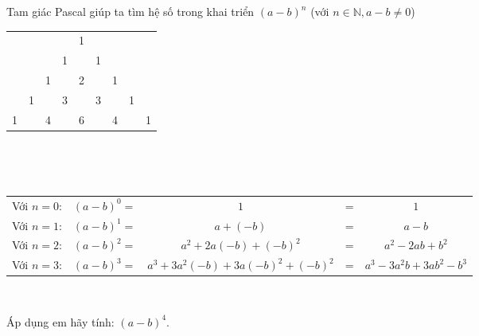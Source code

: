 \begin{bt}%
Tam giác Pascal giúp ta tìm hệ số trong khai triển $(a- b)^n$ (với $n \in \mathbb{N}, a- b \ne 0$) 
\begin{center}\noindent
	\begin{tabular}{ccccccccc}
		& & & &1& & & & \\
		& & &1& &1& & & \\
		& &1& &2& &1& & \\
		&1& &3& &3& &1& \\
		1& &4& &6& &4& &1
	\end{tabular}\\[1ex]
	\parbox{0.4\textwidth}{\dotfill}\\[1ex]
	\begin{tabular}{ccccc}
		Với $n=0$: & $(a-b)^0=$ & $1$ & = & $1$ \\
		Với $n=1$: & $(a-b)^1=$ & $a+(-b)$ & = & $a-b$ \\
		Với $n=2$: & $(a-b)^2=$ & $a^2+2a(-b)+(-b)^2$ & = & $a^2-2ab+b^2$ \\
		Với $n=3$: & $(a-b)^3=$ & $a^3+3a^2(-b)+3a(-b)^2+(-b)^2$ & = & $a^3-3a^2b+3ab^2-b^3$
	\end{tabular}\\[1ex]
	\parbox{0.6\textwidth}{\dotfill}

\end{center}
	Áp dụng em hãy tính: $(a-b)^4$.
\end{bt}

